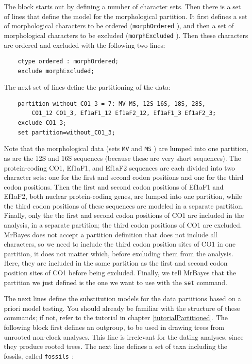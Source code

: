 \documentclass[12pt]{book}
\newcommand{\ttt}[1]{\texttt{#1} }
\begin{document}
The block starts out by defining a number of character sets. Then there is a set of lines that
define the model for the morphological partition. It first defines a set of morphological
characters to be ordered (\ttt{morphOrdered}), and then a set of morphological characters to be
excluded (\ttt{morphExcluded}).  Then these characters are ordered and excluded with the
following two lines:

\begin{singlespacing}
\begin{verbatim}
    ctype ordered : morphOrdered;
    exclude morphExcluded;
\end{verbatim}
\end{singlespacing}

The next set of lines define the partitioning of the data:

\begin{singlespacing}
\begin{verbatim}
    partition without_CO1_3 = 7: MV MS, 12S 16S, 18S, 28S,
        CO1_12 CO1_3, Ef1aF1_12 Ef1aF2_12, Ef1aF1_3 Ef1aF2_3;
    exclude CO1_3;
    set partition=without_CO1_3;
\end{verbatim}
\end{singlespacing}

Note that the morphological data (sets \ttt{MV} and \ttt{MS}) are lumped into one partition, as are
the 12S and 16S sequences (because these are very short sequences). The protein-coding CO1, Ef1aF1,
and Ef1aF2 sequences are each divided into two character sets: one for the first and second codon
positions and one for the third codon positions. Then the first and second codon positions of
Ef1aF1 and Ef1aF2, both nuclear protein-coding genes, are lumped into one partition, while the
third codon positions of these sequences are modeled in a separate partition. Finally, only the the
first and second codon positions of CO1 are included in the analysis, in a separate partition; the
third codon positions of CO1 are excluded. MrBayes does not accept a partition definition that does
not include all characters, so we need to include the third codon position sites of CO1 in one
partition, it does not matter which, before excluding them from the analysis. Here, they are
included in the same partition as the first and second codon position sites of CO1 before being
excluded.  Finally, we tell MrBayes that the partition we just defined is the one we want to use
with the \ttt{set} command.

The next lines define the substitution models for the data partitions based on a priori model
testing. You should already be familiar with the structure of these commands; if not, refer to the
tutorial in chapter \ref{tutorialPartitioned}.  The following block first defines an outgroup, to
be used in drawing trees from unrooted non-clock analyses. This line is irrelevant for the dating
analyses, since they produce rooted trees. The next line defines a set of taxa including the
fossils, called \ttt{fossils}:
\end{document}
